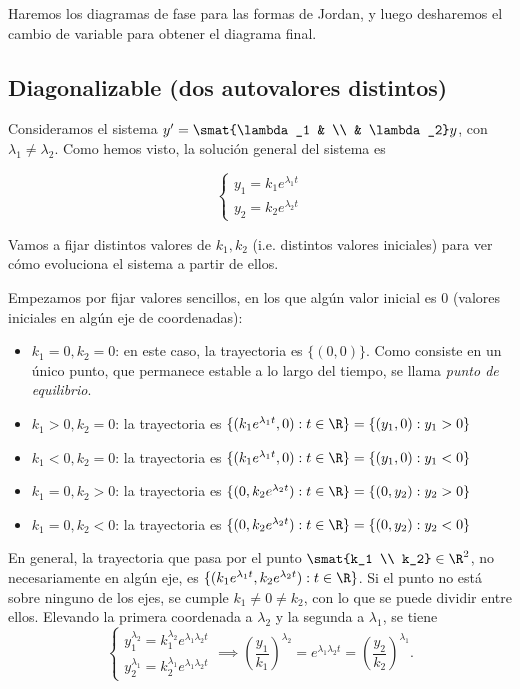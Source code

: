 \documentclass[../main.tex]{subfiles}
\begin{document}
Haremos los diagramas de fase para las formas de Jordan, y luego desharemos el
cambio de variable para obtener el diagrama final.

\subsection{Diagonalizable (dos autovalores distintos)}

Consideramos el sistema \(y' = \smat{\lambda_1 & \\ & \lambda_2} y\), con
\(\lambda_1 \neq \lambda_2\). Como hemos visto, la solución general del sistema
es

\[
  \begin{cases}
    y_1 = k_1e^{\lambda_1 t} \\
    y_2 = k_2e^{\lambda_2 t}
  \end{cases}
\]

Vamos a fijar distintos valores de \(k_1,k_2\) (i.e. distintos valores
iniciales) para ver cómo evoluciona el sistema a partir de ellos.

Empezamos por fijar valores sencillos, en los que algún valor inicial es 0
(valores iniciales en algún eje de coordenadas):

\begin{itemize}
\item \(k_1 = 0, k_2 = 0\): en este caso, la trayectoria es \(\{(0,0)\}\). Como
  consiste en un único punto, que permanece estable a lo largo del tiempo, se
  llama \emph{punto de equilibrio}.
\item \(k_1 > 0, k_2 = 0\): la trayectoria es \(\{(k_1e^{\lambda_1 t}, 0) : t \in
  \R\} = \{(y_1, 0) : y_1 > 0\}\)
\item \(k_1 < 0, k_2 = 0\): la trayectoria es \(\{(k_1e^{\lambda_1 t}, 0) : t \in
  \R\} = \{(y_1, 0) : y_1 < 0\}\)
\item \(k_1 = 0, k_2 > 0\): la trayectoria es \(\{(0, k_2e^{\lambda_2 t}) : t
  \in \R\} = \{(0,y_2) : y_2 > 0\}\)
\item \(k_1 = 0, k_2 < 0\): la trayectoria es \(\{(0, k_2e^{\lambda_2 t}) : t
  \in \R\} = \{(0,y_2) : y_2 < 0\}\)
\end{itemize}

En general, la trayectoria que pasa por el punto \(\smat{k_1 \\ k_2} \in \R^2\),
no necesariamente en algún eje, es
\(\{(k_1e^{\lambda_1 t}, k_2e^{\lambda_2 t}) : t \in \R\}\). Si el punto no está
sobre ninguno de los ejes, se cumple \(k_1 \neq 0 \neq k_2\), con lo que se
puede dividir entre ellos. Elevando la primera coordenada a \(\lambda_2\) y la
segunda a \(\lambda_1\), se tiene
\begin{equation}\label{eq:impl}
  \begin{cases}
    y_1^{\lambda_2} = k_1^{\lambda_2}e^{\lambda_1\lambda_2 t} \\
    y_2^{\lambda_1} = k_2^{\lambda_1}e^{\lambda_1\lambda_2 t}
  \end{cases} \implies \left(\frac{y_1}{k_1}\right)^{\lambda_2} = e^{\lambda_1
    \lambda_2 t} = \left(\frac{y_2}{k_2}\right)^{\lambda_1}.
\end{equation}
\end{document}
